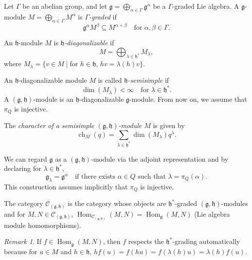 \documentclass[a4paper, 12pt, reqno]{amsart}
\theoremstyle{remark}
\newtheorem{remark}[theorem]{Remark}
\DeclareMathOperator{\ch}{ch}
\DeclareMathOperator{\Hom}{Hom}
\begin{document}
Let $\Gamma$ be an abelian group, and let $\mathfrak{g} = \bigoplus_{\alpha \in \Gamma}\mathfrak{g}^{\alpha}$ be a $\Gamma$-graded Lie algebra.
A $\mathfrak{g}$-module $M = \bigoplus_{\alpha \in \Gamma}M^{\alpha}$ is \emph{$\Gamma$-graded} if
\begin{equation*}
  \mathfrak{g}^{\alpha}M^{\beta} \subseteq M^{\alpha + \beta} \quad \text{for $\alpha, \beta \in \Gamma$}.
\end{equation*}

An $\mathfrak{h}$-module $M$ is \emph{$\mathfrak{h}$-diagonalizable} if
\begin{equation*}
  M = \bigoplus_{\lambda \in \mathfrak{h}^*}M_{\lambda},
\end{equation*}
where $M_{\lambda} = \{v \in M \mid \text{for $h \in \mathfrak{h}$, $hv = \lambda(h)v$}\}$.

An $\mathfrak{h}$-diagonalizable module $M$ is called \emph{$\mathfrak{h}$-semisimple} if
\begin{equation*}
  \dim(M_{\lambda}) < \infty \quad \text{for $\lambda \in \mathfrak{h}^*$}.
\end{equation*}
A $(\mathfrak{g}, \mathfrak{h})$-module is an $\mathfrak{h}$-diagonalizable $\mathfrak{g}$-module.
From now on, we assume that $\pi_Q$ is injective.

The \emph{character of a semisimple $(\mathfrak{g}, \mathfrak{h})$-module $M$} is given by
\begin{equation*}
  \ch_M(q) = \sum_{\lambda \in \mathfrak{h}^*}\dim(M_{\lambda})q^{\lambda}.
\end{equation*}

We can regard $\mathfrak{g}$ as a $(\mathfrak{g}, \mathfrak{h})$-module via the adjoint representation and by declaring for $\lambda \in \mathfrak{h}^*$,
\begin{equation*}
  \mathfrak{g}_{\lambda} = \mathfrak{g}^{\alpha} \quad \text{if there exists $\alpha \in Q$ such that $\lambda = \pi_Q(\alpha)$}.
\end{equation*}
This construction assumes implicitly that $\pi_Q$ is injective.

The category $\mathcal{C}_{(\mathfrak{g}, \mathfrak{h})}$ is the category whose objects are $\mathfrak{h}^*$-graded $(\mathfrak{g}, \mathfrak{h})$-modules and for $M, N \in \mathcal{C}_{(\mathfrak{g}, \mathfrak{h})}$, $\Hom_{\mathcal{C}_{(\mathfrak{g}, \mathfrak{h})}}(M, N) = \Hom_{\mathfrak{g}}(M, N)$ (Lie algebra module homomorphisms).

\begin{remark}
  \label{rmk:1}
  If $f \in \Hom_{\mathfrak{g}}(M, N)$, then $f$ respects the $\mathfrak{h}^*$-grading automatically because for $u \in M$ and $h \in \mathfrak{h}$, $hf(u) = f(hu) = f(\lambda(h)u) = \lambda(h)f(u)$.
\end{remark}
\end{document}
